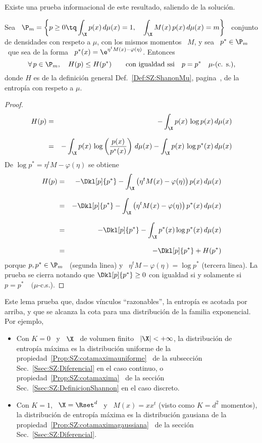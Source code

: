 Existe   una  prueba   informacional   de  este   resultado,   saliendo  de   la
soluci\'on.
%
\begin{lema}
\label{Lem:SZ:MaxEntPruebaInfo}
%
Sea \  $\displaystyle \P_m = \left\{  p \ge 0 \tq  \int_\X p(x) \,  d\mu(x) = 1,
  \quad \int_\X M(x)  \, p(x) \, d\mu(x) = m \right\}$  \ conjunto de densidades
con respeto a $\mu$, con los mismos momentos \ $M$, y sea \ $p^* \in \P_m$ \ que
sea de la forma \ $p^*(x) = \e^{\eta^t M(x) - \varphi(\eta)}$. Entonces
  \[
  \forall \,  p \in \P_m, \quad  H(p) \le H(p^*) \qquad  \mbox{con igualdad ssi}
  \quad p = p^* \quad \mu\mbox{-(c. s.)},
  \]
  donde   $H$  es   de  la   definici\'on   general  Def.~\ref{Def:SZ:ShanonMu},
  pagina~\pageref{Def:SZ:ShanonMu}, de la entrop\'ia con respeto a $\mu$.
\end{lema}
%
\begin{proof}
  \begin{eqnarray*}
  H(p) & = & - \int_\X p(x) \, \log p(x) \, d\mu(x)\\[2.5mm]
  & = & - \int_\X p(x) \, \log\left( \frac{p(x)}{p^*(x)} \right) \, d\mu(x) - \int_\X
  p(x) \, \log p^*(x) \, d\mu(x)
  \end{eqnarray*}
  De $\log p^* = \eta^t M - \varphi(\eta)$ se obtiene
  \begin{eqnarray*}
  H(p) & = & - \Dkl[p]{p^*} - \int_\X \left( \eta^t M(x) - \varphi(\eta) \right) p(x)
  \, d\mu(x)\\[2.5mm]
  & = & - \Dkl[p]{p^*} - \int_\X \left( \eta^t M(x) - \varphi(\eta) \right) p^*(x) \, d\mu(x)\\[2.5mm]
  & = & - \Dkl[p]{p^*} - \int_\X p^*(x) \log p^*(x) \, d\mu(x)\\[2.5mm]
  & = & - \Dkl[p]{p^*} + H(p^*)
  \end{eqnarray*}
  porque $p,  p^* \in \P_m$ \  (segunda linea) y  \ $\eta^t M -  \varphi(\eta) =
  \log p^*$ (tercera  linea). La prueba se cierra  notando que $\Dkl[p]{p^*} \ge
  0$ con igualdad si y solamente si $p = p^* \quad (\mu$-c.s.).
\end{proof}
%
Este lema prueba que, dados  v\'inculos ``razonables'', la entrop\'ia es acotada
por  arriba, y que  se alcanza  la cota  para una  distribuci\'on de  la familia
exponencial. Por ejemplo,
%
\begin{itemize}
\item Con  $K =  0$ \  y \  $\X$ \ de  volumen finito  \ $|\X|  < +  \infty$, la
  distribuci\'on  de entrop\'ia  m\'axima es  la distribuci\'on  uniforme  de la
  propiedad~\ref{Prop:SZ:cotamaximauniforme}      \     de      la     subsecci\'on
  Sec.~\ref{Ssec:SZ:Diferencial}      en       el      caso      continuo,      o
  propiedad~\ref{Prop:SZ:cotamaxima}        \       de        la       secci\'on
  Sec.~\ref{Ssec:SZ:DefinicionShannon} en el caso discreto.
%
\item Con $K = 1$,  \ $\X = \Rset^d$ \ y \ $M(x) = x  x^t$ (visto como $K = d^2$
  momentos),  la  distribuci\'on de  entrop\'ia  m\'axima  es la  distribuci\'on
  gausiana de  la propiedad~\ref{Prop:SZ:cotamaximagaussiana} \  de la secci\'on
  Sec.~\ref{Ssec:SZ:Diferencial}.
\end{itemize}
